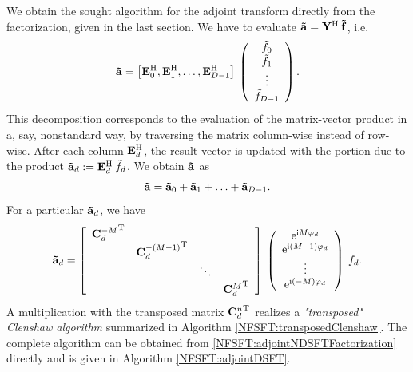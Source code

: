 We obtain the sought algorithm for the adjoint transform directly from the factorization, given in the last section. We have to evaluate $\mathbf{\tilde{a}} = \mathbf{Y}^{\text{\rm{H}}} \: \mathbf{\tilde{f}}$, i.e.
\[
  \mathbf{\tilde{a}}
  =
  \left[
    \mathbf{E}_{0}^{\text{\rm{H}}},
    \mathbf{E}_{1}^{\text{\rm{H}}},
    \ldots,
    \mathbf{E}_{D-1}^{\text{\rm{H}}}
  \right]
  \:
  \left(\begin{array}{c}
    \tilde{f}_{0}\\
    \tilde{f}_{1}\\
    \vdots\\
    \tilde{f}_{D-1}
  \end{array}\right). 
\]
This decomposition corresponds to the evaluation of the matrix-vector product in a, say, nonstandard 
way, by traversing the 
matrix column-wise instead of row-wise. After each column $\mathbf{E}_{d}^{\text{\rm{H}}}$, the result vector is updated with the portion due 
to the product $\mathbf{\tilde{a}}_{d} := \mathbf{E}^{\text{\rm{H}}}_{d} \: \tilde{f}_{d}$. We obtain $\mathbf{\tilde{a}}$ as
\begin{equation}
  \nonumber
  \mathbf{\tilde{a}} = \mathbf{\tilde{a}}_{0} + \mathbf{\tilde{a}}_{1} + \ldots + \mathbf{\tilde{a}}_{D-1}.
\end{equation}
For a particular $\mathbf{\tilde{a}}_{d}$, we have
\begin{equation}
  \label{NFSFT:adjointNDSFTFactorization}
  \mathbf{\tilde{a}}_{d}
  =
  \left[\begin{array}{cccc}
    {\mathbf{C}^{-M}_{d}}^{\text{\rm{T}}} &                               &        &                           \\
                              & {\mathbf{C}^{-(M-1)}_{d}}^{\text{\rm{T}}} &        &                           \\
                              &                                & \ddots &                           \\
                              &                                &        & {\mathbf{C}^{M}_{d}}^{\text{\rm{T}}} 
  \end{array}\right]
  \:
  \left(\begin{array}{c}
    \mbox{\rm{e}}^{\mbox{\scriptsize\rm{i}} M \varphi_{d}}\\
    \mbox{\rm{e}}^{\mbox{\scriptsize\rm{i}} (M-1) \varphi_{d}}\\
    \vdots\\
    \mbox{\rm{e}}^{\mbox{\scriptsize\rm{i}} (-M) \varphi_{d}}
  \end{array}\right)
  \:
  f_{d}.
\end{equation}
A multiplication with the transposed matrix ${\mathbf{C}^{n}_{d}}^{\text{\rm{T}}}$ realizes a \emph{"transposed" Clenshaw algorithm} summarized in Algorithm \ref{NFSFT:transposedClenshaw}. The complete algorithm can be obtained from \eqref{NFSFT:adjointNDSFTFactorization} directly and is given in Algorithm \ref{NFSFT:adjointDSFT}.
